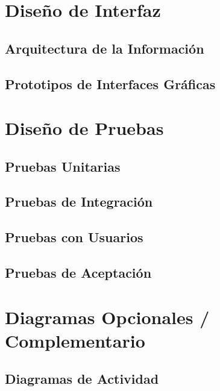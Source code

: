 \section{Diseño de Interfaz}\label{sc:DI}
    \subsection{Arquitectura de la Información}\label{ssc:AA}
    \subsection{Prototipos de Interfaces Gráficas}\label{ssc:IGraph}

\section{Diseño de Pruebas}\label{sc:DP}
    \subsection{Pruebas Unitarias}\label{ssc:UT}
    \subsection{Pruebas de Integración}\label{ssc:IT}
    \subsection{Pruebas con Usuarios}\label{ssc:PU}
    \subsection{Pruebas de Aceptación}\label{ssc:PA}

\section{Diagramas Opcionales / Complementario}\label{sc:OP}
    \subsection{Diagramas de Actividad}\label{ssc:DA}
